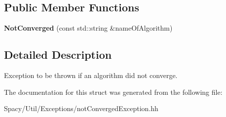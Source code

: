 \subsection*{Public Member Functions}
\begin{DoxyCompactItemize}
\item 
\hypertarget{structSpacy_1_1Exception_1_1NotConverged_ad8da434f7ab60570e598b4e3a659072d}{}{\bfseries Not\+Converged} (const std\+::string \&name\+Of\+Algorithm)\label{structSpacy_1_1Exception_1_1NotConverged_ad8da434f7ab60570e598b4e3a659072d}

\end{DoxyCompactItemize}


\subsection{Detailed Description}
Exception to be thrown if an algorithm did not converge. 

The documentation for this struct was generated from the following file\+:\begin{DoxyCompactItemize}
\item 
Spacy/\+Util/\+Exceptions/not\+Converged\+Exception.\+hh\end{DoxyCompactItemize}
